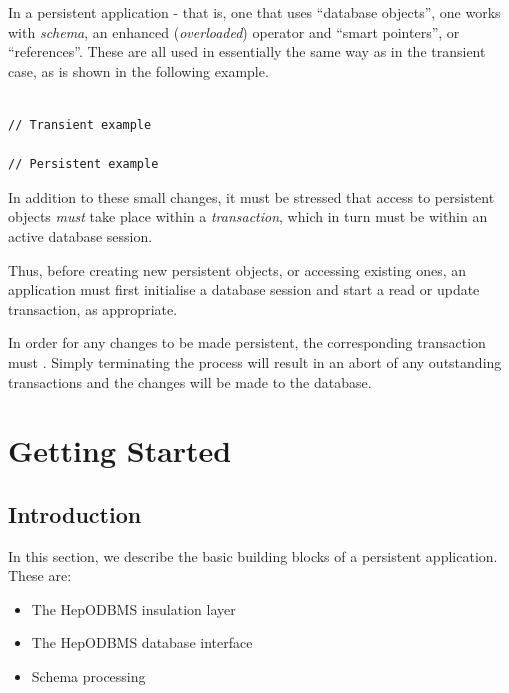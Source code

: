 In a persistent application - that is, one that uses ``database objects'',
one works with \emph{schema}, an enhanced (\emph{overloaded}) 
operator and ``smart pointers'', or ``references''. These are all
used in essentially the same way as in the transient case, as is shown in the following example.

\begin{verbatim}

// Transient example

// Persistent example

\end{verbatim}

\par

In addition to these small changes, it must be stressed that access to persistent
objects \emph{must} take place within a \emph{transaction},
which in turn must be within an active database session.
\par

Thus, before creating new persistent objects, or accessing existing ones, an application
must first initialise a database session and start a read or update transaction, as 
appropriate.
\par

In order for any changes to be made persistent, the corresponding transaction must 
. Simply terminating the process will result in an abort of any
outstanding transactions and the changes will  be made to the database.
\chapter{Getting Started\label{H1GettingStarted}}
\section{Introduction}

\par

In this section, we describe the basic building blocks of a persistent application.
These are:

\begin{itemize}

\item The HepODBMS insulation layer
\item The HepODBMS database interface
\item Schema processing\end{itemize}

